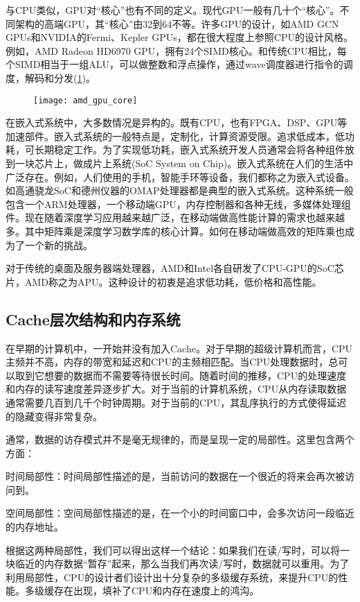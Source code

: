 与CPU类似，GPU对“核心”也有不同的定义。现代GPU一般有几十个“核心”。不同架构的高端GPU，其“核心”由32到64不等。许多GPU的设计，如AMD GCN GPUs和NVIDIA的Fermi、Kepler GPUs，都在很大程度上参照CPU的设计风格。例如，AMD Radeon HD6970 GPU，拥有24个SIMD核心。和传统CPU相比，每个SIMD相当于一组ALU，可以做整数和浮点操作，通过wave调度器进行指令的调度，解码和分发(\ref{fig:amd_gpu_core})。
\begin{figure}[htbp]
	\centering
	\texttt{[image: amd\_gpu\_core]}
	\label{fig:amd_gpu_core}
\end{figure}

在嵌入式系统中，大多数情况是异构的。既有CPU，也有FPGA、DSP、GPU等加速部件。嵌入式系统的一般特点是，定制化，计算资源受限。追求低成本，低功耗，可长期稳定工作。为了实现低功耗，嵌入式系统开发人员通常会将各种组件放到一块芯片上，做成片上系统(SoC System on Chip)。嵌入式系统在人们的生活中广泛存在。例如，人们使用的手机，智能手环等设备，我们都称之为嵌入式设备。如高通骁龙SoC和德州仪器的OMAP处理器都是典型的嵌入式系统。这种系统一般包含一个ARM处理器，一个移动端GPU，内存控制器和各种无线，多媒体处理组件。现在随着深度学习应用越来越广泛，在移动端做高性能计算的需求也越来越多。其中矩阵乘是深度学习数学库的核心计算。如何在移动端做高效的矩阵乘也成为了一个新的挑战。

对于传统的桌面及服务器端处理器，AMD和Intel各自研发了CPU-GPU的SoC芯片，AMD称之为APU。这种设计的初衷是追求低功耗，低价格和高性能。

\subsection{Cache层次结构和内存系统}
在早期的计算机中，一开始并没有加入Cache。对于早期的超级计算机而言，CPU主频并不高，内存的带宽和延迟和CPU的主频相匹配。当CPU处理数据时，总可以取到它想要的数据而不需要等待很长时间。随着时间的推移，CPU的处理速度和内存的读写速度差异逐步扩大。对于当前的计算机系统，CPU从内存读取数据通常需要几百到几千个时钟周期。对于当前的CPU，其乱序执行的方式使得延迟的隐藏变得非常复杂。

通常，数据的访存模式并不是毫无规律的，而是呈现一定的局部性。这里包含两个方面：

时间局部性：时间局部性描述的是，当前访问的数据在一个很近的将来会再次被访问到。

空间局部性：空间局部性描述的是，在一个小的时间窗口中，会多次访问一段临近的内存地址。

根据这两种局部性，我们可以得出这样一个结论：如果我们在读/写时，可以将一块临近的内存数据“暂存”起来，那么当我们再次读/写时，数据就可以重用。为了利用局部性，CPU的设计者们设计出十分复杂的多级缓存系统，来提升CPU的性能。多级缓存在出现，填补了CPU和内存在速度上的鸿沟。

